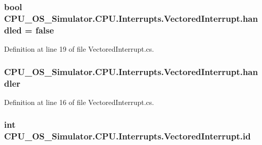 \subsubsection[{handled}]{\setlength{\rightskip}{0pt plus 5cm}bool C\+P\+U\+\_\+\+O\+S\+\_\+\+Simulator.\+C\+P\+U.\+Interrupts.\+Vectored\+Interrupt.\+handled = false\hspace{0.3cm}{\ttfamily [private]}}\label{class_c_p_u___o_s___simulator_1_1_c_p_u_1_1_interrupts_1_1_vectored_interrupt_a12c7df81f02d946f6febbc38240a6460}


Definition at line 19 of file Vectored\+Interrupt.\+cs.

\hypertarget{class_c_p_u___o_s___simulator_1_1_c_p_u_1_1_interrupts_1_1_vectored_interrupt_a13e9b0f3b6f66f67fa510bd9930b3765}{}
\subsubsection[{handler}]{ C\+P\+U\+\_\+\+O\+S\+\_\+\+Simulator.\+C\+P\+U.\+Interrupts.\+Vectored\+Interrupt.\+handler\hspace{0.3cm}{\ttfamily [private]}}\label{class_c_p_u___o_s___simulator_1_1_c_p_u_1_1_interrupts_1_1_vectored_interrupt_a13e9b0f3b6f66f67fa510bd9930b3765}


Definition at line 16 of file Vectored\+Interrupt.\+cs.

\hypertarget{class_c_p_u___o_s___simulator_1_1_c_p_u_1_1_interrupts_1_1_vectored_interrupt_a799d7985bc1cc6626ee8a39a41897630}{}
\subsubsection[{id}]{\setlength{\rightskip}{0pt plus 5cm}int C\+P\+U\+\_\+\+O\+S\+\_\+\+Simulator.\+C\+P\+U.\+Interrupts.\+Vectored\+Interrupt.\+id\hspace{0.3cm}{\ttfamily [private]}}\label{class_c_p_u___o_s___simulator_1_1_c_p_u_1_1_interrupts_1_1_vectored_interrupt_a799d7985bc1cc6626ee8a39a41897630}


